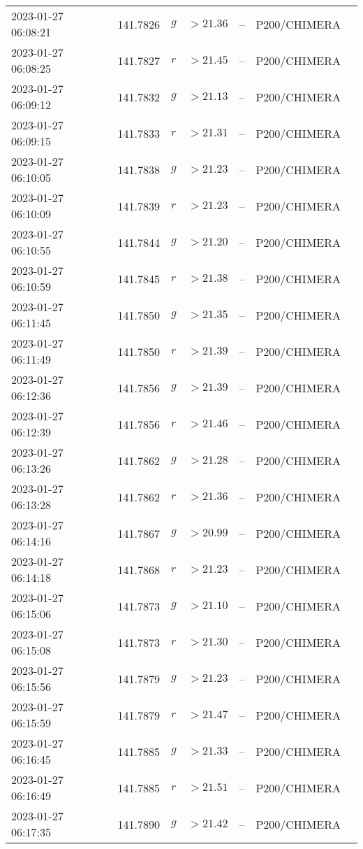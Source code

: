 \documentclass{nature_plusfigure}
\begin{document}
\begin{supplement}
\begin{center}
\begin{longtable}{lllllll}
2023-01-27 06:08:21 & 141.7826 & $g$ & $>21.36$ & -- & P200/CHIMERA &  \\ 
2023-01-27 06:08:25 & 141.7827 & $r$ & $>21.45$ & -- & P200/CHIMERA &  \\ 
2023-01-27 06:09:12 & 141.7832 & $g$ & $>21.13$ & -- & P200/CHIMERA &  \\ 
2023-01-27 06:09:15 & 141.7833 & $r$ & $>21.31$ & -- & P200/CHIMERA &  \\ 
2023-01-27 06:10:05 & 141.7838 & $g$ & $>21.23$ & -- & P200/CHIMERA &  \\ 
2023-01-27 06:10:09 & 141.7839 & $r$ & $>21.23$ & -- & P200/CHIMERA &  \\ 
2023-01-27 06:10:55 & 141.7844 & $g$ & $>21.20$ & -- & P200/CHIMERA &  \\ 
2023-01-27 06:10:59 & 141.7845 & $r$ & $>21.38$ & -- & P200/CHIMERA &  \\ 
2023-01-27 06:11:45 & 141.7850 & $g$ & $>21.35$ & -- & P200/CHIMERA &  \\ 
2023-01-27 06:11:49 & 141.7850 & $r$ & $>21.39$ & -- & P200/CHIMERA &  \\ 
2023-01-27 06:12:36 & 141.7856 & $g$ & $>21.39$ & -- & P200/CHIMERA &  \\ 
2023-01-27 06:12:39 & 141.7856 & $r$ & $>21.46$ & -- & P200/CHIMERA &  \\ 
2023-01-27 06:13:26 & 141.7862 & $g$ & $>21.28$ & -- & P200/CHIMERA &  \\ 
2023-01-27 06:13:28 & 141.7862 & $r$ & $>21.36$ & -- & P200/CHIMERA &  \\ 
2023-01-27 06:14:16 & 141.7867 & $g$ & $>20.99$ & -- & P200/CHIMERA &  \\ 
2023-01-27 06:14:18 & 141.7868 & $r$ & $>21.23$ & -- & P200/CHIMERA &  \\ 
2023-01-27 06:15:06 & 141.7873 & $g$ & $>21.10$ & -- & P200/CHIMERA &  \\ 
2023-01-27 06:15:08 & 141.7873 & $r$ & $>21.30$ & -- & P200/CHIMERA &  \\ 
2023-01-27 06:15:56 & 141.7879 & $g$ & $>21.23$ & -- & P200/CHIMERA &  \\ 
2023-01-27 06:15:59 & 141.7879 & $r$ & $>21.47$ & -- & P200/CHIMERA &  \\ 
2023-01-27 06:16:45 & 141.7885 & $g$ & $>21.33$ & -- & P200/CHIMERA &  \\ 
2023-01-27 06:16:49 & 141.7885 & $r$ & $>21.51$ & -- & P200/CHIMERA &  \\ 
2023-01-27 06:17:35 & 141.7890 & $g$ & $>21.42$ & -- & P200/CHIMERA &  \\ 

\end{longtable}
\end{center}
\end{supplement}
\end{document}
